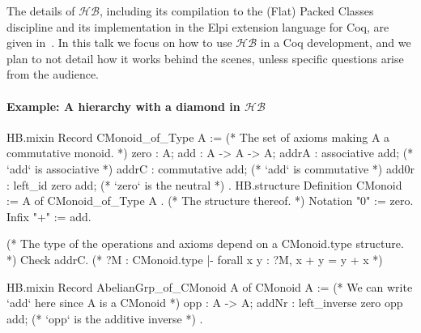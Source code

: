 \documentclass{easychair}
\newcommand{\HB}{\ensuremath{\mathcal{HB}}}
\begin{document}
The details of \HB{}, including its compilation to the (Flat) Packed Classes
discipline and its implementation in the Elpi extension language for Coq,
are given in~\cite{cohen:hal-02478907}.
In this talk we focus on how to use \HB{} in a Coq development, and we plan
to not detail how it works behind the scenes, unless specific questions
arise from the audience.

\paragraph{Example: A hierarchy with a diamond in \HB{}}

\begin{coqcode}
HB.mixin Record CMonoid_of_Type A := { (* The set of axioms making A a commutative monoid. *)
  zero  : A;
  add   : A -> A -> A;
  addrA : associative add;  (* `add` is associative  *)
  addrC : commutative add;  (* `add` is commutative  *)
  add0r : left_id zero add; (* `zero` is the neutral *)
}.
HB.structure Definition CMonoid := { A of CMonoid_of_Type A }. (* The structure thereof. *)
Notation "0" := zero.
Infix    "+" := add.

(* The type of the operations and axioms depend on a CMonoid.type structure. *)
Check addrC. (* ?M : CMonoid.type |- forall x y : ?M, x + y = y + x *)

HB.mixin Record AbelianGrp_of_CMonoid A of CMonoid A := {
  (* We can write `add` here since A is a  CMonoid   *)
  opp   : A -> A;
  addNr : left_inverse zero opp add; (* `opp` is the additive inverse *)
}.
\end{coqcode}

\newpage
\end{document}
